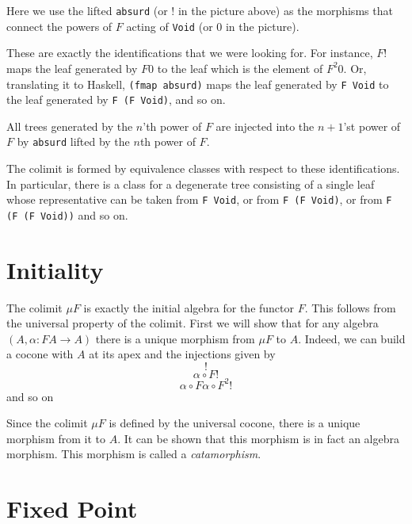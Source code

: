 \documentclass[11pt]{amsart}
\newcommand{\hask}[1]{\texttt{#1}}
\begin{document}
Here we use the lifted \hask{absurd} (or $!$ in the picture above) as the morphisms that connect the powers of $F$ acting of \hask{Void} (or $0$ in the picture). 

These are exactly the identifications that we were looking for. For instance, $F !$ maps the leaf generated by $F 0$ to the leaf which is the element of $F^2 0$. Or, translating it to Haskell, \hask{(fmap absurd)} maps the leaf generated by \hask{F Void} to the leaf generated by \hask{F (F Void)}, and so on. 

All trees generated by the $n$'th power of $F$ are injected into the $n+1$'st power of $F$ by \hask{absurd} lifted by the $n$th power of $F$. 

The colimit is formed by equivalence classes with respect to these identifications. In particular, there is a class for a degenerate tree consisting of a single leaf whose representative can be taken from \hask{F Void}, or from \hask{F (F Void)}, or from \hask{F (F (F Void))} and so on. 

\section{Initiality}

The colimit $\mu F$ is exactly the initial algebra for the functor $F$. This follows from the universal property of the colimit. First we will show that for any algebra $(A, \alpha \colon F A \to A)$ there is a unique morphism from $\mu F$ to $A$. Indeed, we can build a cocone with $A$ at its apex and the injections given by 
\[!\]
\[\alpha \circ F !\]
\[\alpha \circ F \alpha \circ F^2 !\]
and so on

\begin{figure}[H]
\centering
{}
\end{figure}

Since the colimit $\mu F$ is defined by the universal cocone, there is a unique morphism from it to $A$. It can be shown that this morphism is in fact an algebra morphism. This morphism is called a \textit{catamorphism}.

\section{Fixed Point}
\end{document}
